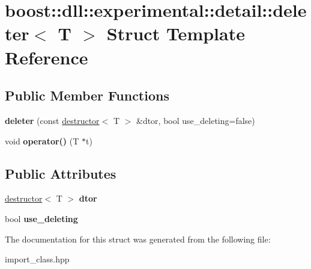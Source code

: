 \hypertarget{a01648}{}\section{boost\+:\+:dll\+:\+:experimental\+:\+:detail\+:\+:deleter$<$ T $>$ Struct Template Reference}
\label{a01648}
\subsection*{Public Member Functions}
\begin{DoxyCompactItemize}
\item 
\mbox{\label{a01648_adccf6c423819a9ef6b7fe4dc568c2c7c}} 
{\bfseries deleter} (const \hyperlink{a01360}{destructor}$<$ T $>$ \&dtor, bool use\+\_\+deleting=false)
\item 
\mbox{\label{a01648_af99da33db6b4418227c035f53098c85f}} 
void {\bfseries operator()} (T $\ast$t)
\end{DoxyCompactItemize}
\subsection*{Public Attributes}
\begin{DoxyCompactItemize}
\item 
\mbox{\label{a01648_a586c2758249157c72ce2b71bb79e4efd}} 
\hyperlink{a01360}{destructor}$<$ T $>$ {\bfseries dtor}
\item 
\mbox{\label{a01648_a1cb9ec367d2685a7a21947618468a5d9}} 
bool {\bfseries use\+\_\+deleting}
\end{DoxyCompactItemize}


The documentation for this struct was generated from the following file\+:\begin{DoxyCompactItemize}
\item 
import\+\_\+class.\+hpp\end{DoxyCompactItemize}
